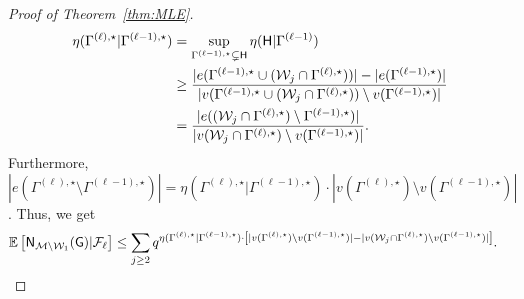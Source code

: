 \documentclass[12pt]{article}
\newcommand{\bE}{\mathbb{E}}
\newcommand{\calF}{{\cal F}}
\newcommand{\calM}{{\cal M}}
\newcommand{\calW}{{\cal W}}
\newcommand{\pp}[1]{\left[#1\right]}
\newcommand{\s}[1]{\mathsf{#1}}
\begin{document}
\begin{proof}[Proof of Theorem~\ref{thm:MLE}]
\begin{align}
   \eta(\Gamma^{(\ell),\star} \vert \Gamma^{(\ell-1),\star})&= \sup_{\Gamma^{(\ell-1),\star}\subsetneq \s{H}} \eta(\s{H} \vert \Gamma^{(\ell-1)})\\
   &\geq\frac{|e(\Gamma^{(\ell-1),\star}\cup(\calW_j\cap\Gamma^{(\ell),\star}))|-|e(\Gamma^{(\ell-1),\star})|}{|v(\Gamma^{(\ell-1),\star}\cup(\calW_j\cap\Gamma^{(\ell),\star}))\setminus v(\Gamma^{(\ell-1),\star})|}\\
   & = \frac{|e((\calW_j\cap\Gamma^{(\ell),\star})\setminus\Gamma^{(\ell-1),\star})|}{|v(\calW_j\cap\Gamma^{(\ell),\star})\setminus v(\Gamma^{(\ell-1),\star})|}.
\end{align}
Furthermore, $|e(\Gamma^{(\ell),\star} \setminus \Gamma^{(\ell-1),\star})| = \eta(\Gamma^{(\ell),\star} \vert \Gamma^{(\ell-1),\star})\cdot|v(\Gamma^{(\ell),\star}) \setminus v(\Gamma^{(\ell-1),\star})|$. Thus, we get
\begin{align}
     \bE\pp{\s{N}_{\calM\setminus\calW_1}(\s{G})\vert\calF_\ell}&\leq \sum_{j\geq2}q^{\eta(\Gamma^{(\ell),\star} \vert \Gamma^{(\ell-1),\star})\cdot\pp{|v(\Gamma^{(\ell),\star}) \setminus v(\Gamma^{(\ell-1),\star})|-|v(\calW_j\cap\Gamma^{(\ell),\star})\setminus v(\Gamma^{(\ell-1),\star})|}}.\label{eqn:momentGenInt0Mid}
\end{align}

\end{proof}
\end{document}
